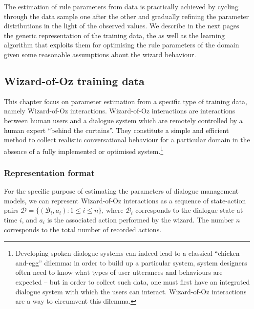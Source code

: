 The estimation of rule parameters from data is practically achieved by cycling through the data sample one after the other and gradually refining the parameter distributions in the light of the observed values. We describe in the next pages the generic representation of the training data, the as well as the learning algorithm that exploits them for optimising the rule parameters of the domain given some reasonable assumptions about the wizard behaviour.  

\subsection{Wizard-of-Oz training data}
\label{sec:rule-supervised-oz}

This chapter focus on parameter estimation from a specific type of training data, namely Wizard-of-Oz interactions. Wizard-of-Oz interactions are interactions between human users and a dialogue system which are remotely controlled by a human expert ``behind the curtains''.  They constitute a simple and efficient method to collect realistic conversational behaviour for a particular domain in the absence of a fully implemented or optimised system.\footnote{Developing spoken dialogue systems can indeed lead to a classical ``chicken-and-egg'' dilemma: in order to build up a particular system, system designers often need to know what types of user utterances and behaviours are expected -- but in order to collect such data, one must first have an integrated dialogue system with which the users can interact.  Wizard-of-Oz interactions are a way to circumvent this dilemma.}


\subsubsection*{Representation format}

For the specific purpose of estimating the parameters of dialogue management models, we can represent Wizard-of-Oz interactions as a sequence of state-action pairs $\mathcal{D} = \{( \mathcal{B}_i, a_i ) : 1 \leq i \leq n\}$, where $\mathcal{B}_i$ corresponds to the dialogue state at time $i$, and $a_i$ is the associated action performed by the wizard.  The number $n$ corresponds to the total number of recorded actions. 

